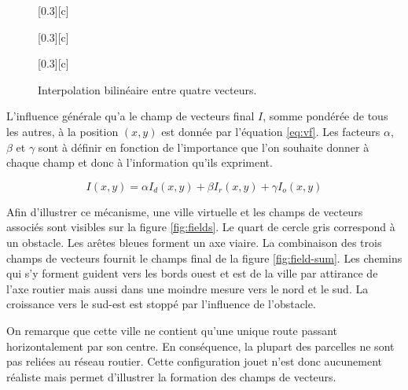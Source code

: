 \documentclass[10pt]{article}
\begin{document}
\begin{figure}[H]
  \centering
  \subcaptionbox{}[0.3\linewidth][c]{
    
  }
  \subcaptionbox{}[0.3\linewidth][c]{
    
  }
  \subcaptionbox{}[0.3\linewidth][c]{
    
  }
  \caption{Interpolation bilinéaire entre quatre vecteurs.}
  \label{fig:bilinear-interp}
\end{figure}

L'influence générale qu'a le champ de vecteurs final $I$, somme
pondérée de tous les autres, à la position $(x,y)$ est donnée par
l'équation \ref{eq:vf}. Les facteurs $\alpha$, $\beta$ et $\gamma$
sont à définir en fonction de l'importance que l'on souhaite donner à
chaque champ et donc à l'information qu'ils expriment.

\begin{equation}
  I(x,y) = \alpha I_d(x,y) + \beta I_r(x,y) + \gamma I_o(x,y)
  \label{eq:vf}
\end{equation}

Afin d'illustrer ce mécanisme, une ville virtuelle et les champs de
vecteurs associés sont visibles sur la figure \ref{fig:fields}. Le
quart de cercle gris correspond à un obstacle. Les arêtes bleues
forment un axe viaire. La combinaison des trois champs de vecteurs
fournit le champs final de la figure \ref{fig:field-sum}. Les chemins
qui s'y forment guident vers les bords ouest et est de la ville par
attirance de l'axe routier mais aussi dans une moindre mesure vers le
nord et le sud. La croissance vers le sud-est est stoppé par
l'influence de l'obstacle.

On remarque que cette ville ne contient qu'une unique route passant
horizontalement par son centre. En conséquence, la plupart des
parcelles ne sont pas reliées au réseau routier. Cette configuration
jouet n'est donc aucunement réaliste mais permet d'illustrer la
formation des champs de vecteurs.
\end{document}
